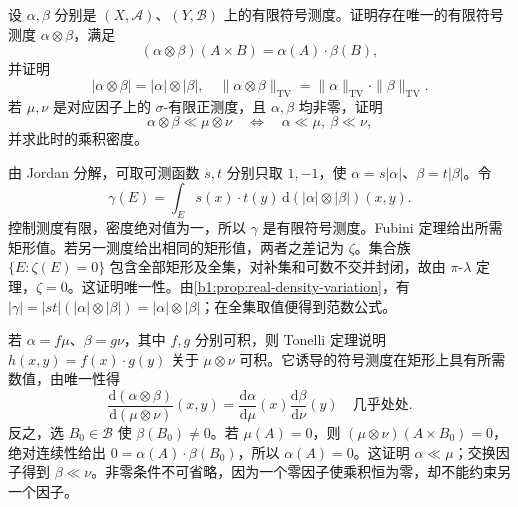 \begin{optionalexercise}\label{b1:ex:07-signed-product}
设 \(\alpha,\beta\) 分别是 \((X,\mathcal A)\)、\((Y,\mathcal B)\) 上的有限符号测度。证明存在唯一的有限符号测度 \(\alpha\otimes\beta\)，满足
\[
(\alpha\otimes\beta)(A\times B)=\alpha(A)\cdot \beta(B),
\]
并证明
\[
|\alpha\otimes\beta|=|\alpha|\otimes|\beta|,
\quad
\|\alpha\otimes\beta\|_{\mathrm{TV}}
=\|\alpha\|_{\mathrm{TV}}\cdot\|\beta\|_{\mathrm{TV}}.
\]
若 \(\mu,\nu\) 是对应因子上的 \(\sigma\)-有限正测度，且 \(\alpha,\beta\) 均非零，证明
\[
\alpha\otimes\beta\ll\mu\otimes\nu
\quad\Longleftrightarrow\quad
\alpha\ll\mu,\ \beta\ll\nu,
\]
并求此时的乘积密度。
\end{optionalexercise}
\begin{solution}
由 Jordan 分解，可取可测函数 \(s,t\) 分别只取 \(1,-1\)，使
\(\alpha=s|\alpha|\)、\(\beta=t|\beta|\)。令
\[
\gamma(E)=\int_Es(x)\cdot t(y)\,\mathrm{d}(|\alpha|\otimes|\beta|)(x,y).
\]
控制测度有限，密度绝对值为一，所以 \(\gamma\) 是有限符号测度。Fubini 定理给出所需矩形值。若另一测度给出相同的矩形值，两者之差记为 \(\zeta\)。集合族 \(\{E:\zeta(E)=0\}\) 包含全部矩形及全集，对补集和可数不交并封闭，故由 \(\pi\)-\(\lambda\) 定理，\(\zeta=0\)。这证明唯一性。由\cref{b1:prop:real-density-variation}，有
\(|\gamma|=|st|(|\alpha|\otimes|\beta|)=|\alpha|\otimes|\beta|\)；在全集取值便得到范数公式。

若 \(\alpha=f\mu\)、\(\beta=g\nu\)，其中 \(f,g\) 分别可积，则 Tonelli 定理说明
\(h(x,y)=f(x)\cdot g(y)\) 关于 \(\mu\otimes\nu\) 可积。它诱导的符号测度在矩形上具有所需数值，由唯一性得
\[
\frac{\mathrm{d}(\alpha\otimes\beta)}{\mathrm{d}(\mu\otimes\nu)}(x,y)
=\frac{\mathrm{d}\alpha}{\mathrm{d}\mu}(x)\frac{\mathrm{d}\beta}{\mathrm{d}\nu}(y)
\quad\text{几乎处处}.
\]
反之，选 \(B_0\in\mathcal B\) 使 \(\beta(B_0)\neq0\)。若 \(\mu(A)=0\)，则
\((\mu\otimes\nu)(A\times B_0)=0\)，绝对连续性给出
\(0=\alpha(A)\cdot \beta(B_0)\)，所以 \(\alpha(A)=0\)。这证明 \(\alpha\ll\mu\)；交换因子得到 \(\beta\ll\nu\)。非零条件不可省略，因为一个零因子使乘积恒为零，却不能约束另一个因子。
\end{solution}

